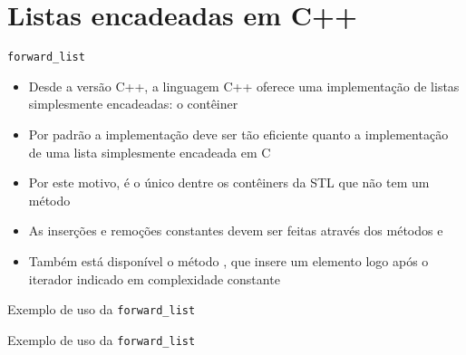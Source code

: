 \section{Listas encadeadas em C++}

\begin{frame}[fragile]{\texttt{forward\_list}}

    \begin{itemize}
        \item Desde a versão C++, a linguagem C++ oferece uma implementação de listas
            simplesmente encadeadas: o contêiner 

        \item Por padrão a implementação deve ser tão eficiente quanto a implementação
            de uma lista simplesmente encadeada em C

        \item Por este motivo, é o único dentre os contêiners da STL que não tem um método

        \item As inserções e remoções constantes devem ser feitas através dos métodos
             e 

        \item Também está disponível o método , que insere um elemento
            logo após o iterador indicado em complexidade constante
    \end{itemize}

\end{frame}

\begin{frame}[fragile]{Exemplo de uso da \texttt{forward\_list}}
\end{frame}

\begin{frame}[fragile]{Exemplo de uso da \texttt{forward\_list}}
\end{frame}
